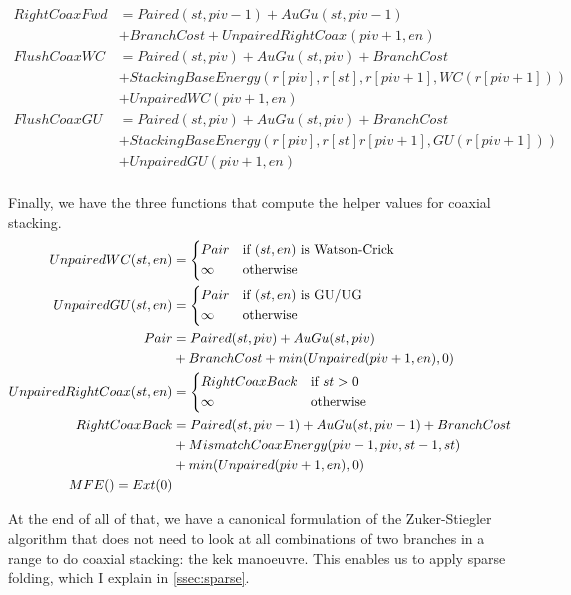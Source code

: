 \documentclass{cshonours}
\begin{document}
\begin{align*}
RightCoaxFwd &= Paired(st, piv - 1) + AuGu(st, piv - 1) \\
  & + BranchCost + UnpairedRightCoax(piv + 1, en) \\
FlushCoaxWC &= Paired(st, piv) + AuGu(st, piv) + BranchCost \\
  & + StackingBaseEnergy(r[piv], r[st], r[piv + 1], WC(r[piv + 1])) \\
  & + UnpairedWC(piv + 1, en) \\
FlushCoaxGU &= Paired(st, piv) + AuGu(st, piv) + BranchCost \\
  & + StackingBaseEnergy(r[piv], r[st] r[piv + 1], GU(r[piv + 1])) \\
  & + UnpairedGU(piv + 1, en) \\
\end{align*}

Finally, we have the three functions that compute the helper values for coaxial stacking.
\begin{align*}
UnpairedWC(st, en) &= \begin{dcases*}
  Pair & if $(st, en)$ is Watson-Crick \\
  \infty & otherwise \\
\end{dcases*} \\
UnpairedGU(st, en) &= \begin{dcases*}
  Pair & if $(st, en)$ is GU/UG \\
  \infty & otherwise \\
\end{dcases*} \\
Pair &= Paired(st, piv) + AuGu(st, piv) \\
  &+ BranchCost + min(Unpaired(piv + 1, en), 0) \\
UnpairedRightCoax(st, en) &= \begin{dcases*}
  RightCoaxBack & if $st > 0$ \\
  \infty & otherwise \\
\end{dcases*} \\
RightCoaxBack &= Paired(st, piv - 1) + AuGu(st, piv - 1) + BranchCost \\
  &+ MismatchCoaxEnergy(piv - 1, piv, st - 1, st) \\
  &+ min(Unpaired(piv + 1, en), 0) \\
MFE() = Ext(0)
\end{align*}

At the end of all of that, we have a canonical formulation of the Zuker-Stiegler algorithm that does not need to look at all combinations of two branches in a range to do coaxial stacking: the kek manoeuvre. This enables us to apply sparse folding, which I explain in \autoref{ssec:sparse}.
\end{document}
